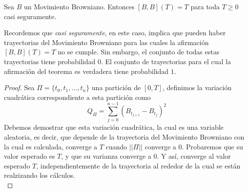 \documentclass[11pt,notitlepage]{article}
\begin{document}
\begin{teor} \label{Secc1.13_Teorema1}
Sea \(B\) un Movimiento Browniano. Entonces \([B,B](T)=T\) para toda \(T \geq 0 \) casi seguramente.\\
\end{teor}
Recordemos que  \textit{casi seguramente}, en este caso, implica que pueden haber trayectorias del Movimiento Browniano para las cuales la afirmación \([B,B](T)=T\) no se cumple.
Sin embargo, el conjunto de todas estas trayectorias tiene probabilidad \(0\). El conjunto de trayectorias
para el cual la afirmación del teorema es verdadera tiene probabilidad \(1\).
\begin{proof}
Sea \(\Pi=\{t_0,t_1,...,t_n\}\) una partición de \([0,T]\), definimos la variación cuadrática correspondiente a esta partición como
\[Q_\Pi= \sum_{j=0}^{n-1} \left(B_{t_{j+1}}-B_{t_j}\right)^2\]
Debemos demostrar que esta variación cuadrática, la cual es una variable aleatoria, es decir, que depende de la trayectoria del Movimiento Browniano con la cual es
calculada, converge a \(T\) cuando \(||\Pi||\) converge a \(0\). Probaremos que su valor esperado es \(T\), y que su varianza converge a \(0\). Y así,  converge al valor esperado \(T\), independientemente de la trayectoria al rededor de la cual se están realzizando los cálculos.\\


\end{proof}
\end{document}
